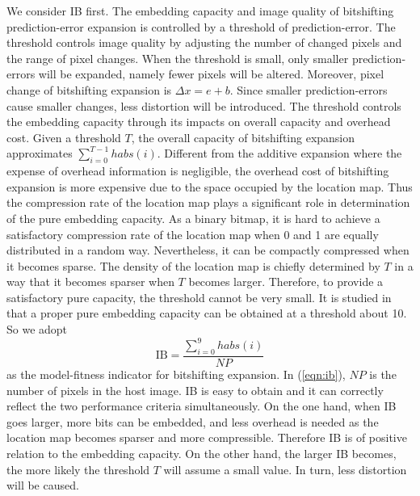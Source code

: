\documentclass[journal]{IEEEtran}
\begin{document}
We consider IB first. The embedding capacity and image quality of bitshifting prediction-error
expansion is controlled by a threshold of prediction-error. The threshold controls image quality by
adjusting the number of changed pixels and the range of pixel changes. When the threshold is small,
only smaller prediction-errors will be expanded, namely fewer pixels will be altered. Moreover,
pixel change of bitshifting expansion is $\Delta x = e + b$. Since smaller prediction-errors cause
smaller changes, less distortion will be introduced. The threshold controls the embedding capacity
through its impacts on overall capacity and overhead cost. Given a threshold $T$, the overall
capacity of bitshifting expansion approximates $\sum_{i=0}^{T-1} habs(i)$.  Different from the
additive expansion where the expense of overhead information is negligible, the overhead cost of
bitshifting expansion is more expensive due to the space occupied by the location map. Thus the
compression rate of the location map plays a significant role in determination of the pure embedding
capacity. As a binary bitmap, it is hard to achieve a satisfactory compression rate of the location
map when 0 and 1 are equally distributed in a random way. Nevertheless, it can be compactly
compressed when it becomes sparse. The density of the location map is chiefly determined by $T$ in a
way that it becomes sparser when $T$ becomes larger. Therefore, to provide a satisfactory pure
capacity, the threshold cannot be very small. It is studied in \cite{Chang07letter} that a proper
pure embedding capacity can be obtained at a threshold about 10.  So we adopt
\begin{equation}\label{eqn:ib}
  \mbox{IB} = \frac{\sum_{i=0}^{9} habs(i)}{\mathit{NP}}
\end{equation}
as the model-fitness indicator for bitshifting expansion. In (\ref{eqn:ib}), $\mathit{NP}$ is the
number of pixels in the host image. IB is easy to obtain and it can correctly reflect the two
performance criteria simultaneously. On the one hand, when IB goes larger, more bits can be
embedded, and less overhead is needed as the location map becomes sparser and more compressible.
Therefore IB is of positive relation to the embedding capacity. On the other hand, the larger IB
becomes, the more likely the threshold $T$ will assume a small value. In turn, less distortion will
be caused.  
\end{document}
